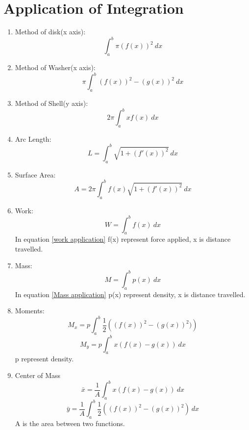 \section{Application of Integration}
	\begin{enumerate}
	\item Method of disk(x axis):
	\begin{equation}
	\int^b_a \pi(f(x))^2\ dx
	\end{equation}
	\item Method of Washer(x axis):
	\begin{equation}
	\pi\int^b_a{(f(x))^2-(g(x))^2\ dx}
	\end{equation}
	\item Method of Shell(y axis):
	\begin{equation}
	2\pi\int^b_a{xf(x)\ dx}
	\end{equation}
	\item Arc Length:
	\begin{equation}
	L=\int^b_a\sqrt{1+(f'(x))^2}\ dx
	\end{equation}
	\item Surface Area:
	\begin{equation}
	A=2\pi\int^b_af(x)\sqrt{1+(f'(x))^2}\ dx
	\end{equation}
	\item Work:
	\begin{equation}
	W=\int^b_af(x)\ dx
	\label{work application}
	\end{equation}
	In equation \ref{work application} f(x) represent force applied, x is distance travelled.
	\item Mass:
	\begin{equation}
	M=\int^b_ap(x)\ dx
	\label{Mass application}
	\end{equation}
	In equation \ref{Mass application} p(x) represent density, x is distance travelled.
	\item Moments:
	\begin{equation}
	M_x=p\int^b_a\frac{1}{2}\left((f(x))^2-(g(x))^2)\right)
	\end{equation}
	\begin{equation}
	M_y=p\int^b_ax\left(f(x)-g(x)\right)\ dx
	\end{equation}
	p represent density.
	\item Center of Mass
	\begin{equation}
	\bar{x}=\frac{1}{A}\int^b_ax(f(x)-g(x))\ dx
	\end{equation}
	\begin{equation}
	\bar{y}=\frac{1}{A}\int^b_a\frac{1}{2}\left((f(x))^2-(g(x))^2\right)\ dx
	\end{equation}
	A is the area between two functions. 
	\end{enumerate}